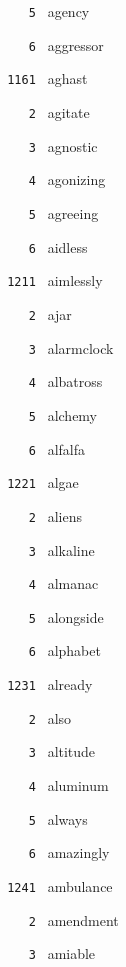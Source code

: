 \documentclass[11pt]{article}
\begin{document}
\begin{multicols}{6}
\noindent \texttt{ \ \ \ 5 } agency  \par
\noindent \texttt{ \ \ \ 6 } aggressor  \par
\vspace{3mm}
\noindent \texttt{ 1161 } aghast  \par
\noindent \texttt{ \ \ \ 2 } agitate  \par
\noindent \texttt{ \ \ \ 3 } agnostic  \par
\noindent \texttt{ \ \ \ 4 } agonizing  \par
\noindent \texttt{ \ \ \ 5 } agreeing  \par
\noindent \texttt{ \ \ \ 6 } aidless  \par
\noindent \texttt{ 1211 } aimlessly  \par
\noindent \texttt{ \ \ \ 2 } ajar  \par
\noindent \texttt{ \ \ \ 3 } alarmclock  \par
\noindent \texttt{ \ \ \ 4 } albatross  \par
\noindent \texttt{ \ \ \ 5 } alchemy  \par
\noindent \texttt{ \ \ \ 6 } alfalfa  \par
\vspace{3mm}
\noindent \texttt{ 1221 } algae  \par
\noindent \texttt{ \ \ \ 2 } aliens  \par
\noindent \texttt{ \ \ \ 3 } alkaline  \par
\noindent \texttt{ \ \ \ 4 } almanac  \par
\noindent \texttt{ \ \ \ 5 } alongside  \par
\noindent \texttt{ \ \ \ 6 } alphabet  \par
\vspace{3mm}
\noindent \texttt{ 1231 } already  \par
\noindent \texttt{ \ \ \ 2 } also  \par
\noindent \texttt{ \ \ \ 3 } altitude  \par
\noindent \texttt{ \ \ \ 4 } aluminum  \par
\noindent \texttt{ \ \ \ 5 } always  \par
\noindent \texttt{ \ \ \ 6 } amazingly  \par
\vspace{3mm}
\noindent \texttt{ 1241 } ambulance  \par
\noindent \texttt{ \ \ \ 2 } amendment  \par
\noindent \texttt{ \ \ \ 3 } amiable  \par

\end{multicols}
\end{document}
